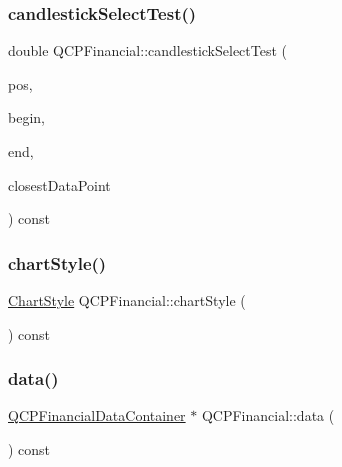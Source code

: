 \subsubsection{\texorpdfstring{candlestickSelectTest()}{candlestickSelectTest()}}
{\footnotesize\ttfamily double Q\+C\+P\+Financial\+::candlestick\+Select\+Test (\begin{DoxyParamCaption}\item[{const Q\+PointF \&}]{pos,  }\item[{const \mbox{\hyperlink{class_q_c_p_data_container_ae40a91f5cb0bcac61d727427449b7d15}{Q\+C\+P\+Financial\+Data\+Container\+::const\+\_\+iterator}} \&}]{begin,  }\item[{const \mbox{\hyperlink{class_q_c_p_data_container_ae40a91f5cb0bcac61d727427449b7d15}{Q\+C\+P\+Financial\+Data\+Container\+::const\+\_\+iterator}} \&}]{end,  }\item[{\mbox{\hyperlink{class_q_c_p_data_container_ae40a91f5cb0bcac61d727427449b7d15}{Q\+C\+P\+Financial\+Data\+Container\+::const\+\_\+iterator}} \&}]{closest\+Data\+Point }\end{DoxyParamCaption}) const\hspace{0.3cm}{\ttfamily [protected]}}

\mbox{\label{class_q_c_p_financial_a5243371c1fde30fdae00555d7760ec2d}} 
\subsubsection{\texorpdfstring{chartStyle()}{chartStyle()}}
{\footnotesize\ttfamily \mbox{\hyperlink{class_q_c_p_financial_a0f800e21ee98d646dfc6f8f89d10ebfb}{Chart\+Style}} Q\+C\+P\+Financial\+::chart\+Style (\begin{DoxyParamCaption}{ }\end{DoxyParamCaption}) const\hspace{0.3cm}{\ttfamily [inline]}}

\mbox{\label{class_q_c_p_financial_aec3f666271cf48bd7b87d84fe3f8c074}} 
\subsubsection{\texorpdfstring{data()}{data()}}
{\footnotesize\ttfamily \mbox{\hyperlink{qcustomplot_8h_ae36e482e04f19a54782f01ab38c354a6}{Q\+C\+P\+Financial\+Data\+Container}} $\ast$ Q\+C\+P\+Financial\+::data (\begin{DoxyParamCaption}{ }\end{DoxyParamCaption}) const\hspace{0.3cm}{\ttfamily [inline]}}


